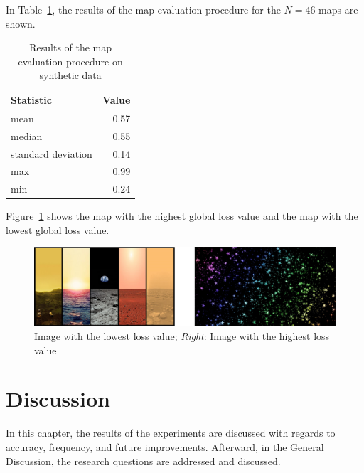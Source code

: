 \documentclass[11pt]{report}
\begin{document}


In Table~\ref{tab:mapeval}, the results of the map evaluation
procedure for the $N = 46$ maps are shown.

\begin{table}[h]
  \centering
  \begin{tabular}{lr}
    \toprule
    Statistic & Value\\
    \midrule
    mean & 0.57\\
    median & 0.55\\
    standard deviation & 0.14\\
    max & 0.99\\
    min & 0.24\\    
    \bottomrule
  \end{tabular}
  \caption[Map evaluation procedure on synthetic data]{Results of the map evaluation procedure on synthetic data}
  \label{tab:mapeval}

\end{table}

Figure~\ref{fig:minmaximg} shows the map with the highest global loss
value and the map with the lowest global loss value.

\begin{figure}[h!]
\begin{center}
\includegraphics[width=0.7\columnwidth]{lowest_highest}
\caption{{\label{fig:minmaximg}
Image with the lowest loss value; \emph{Right}:
    Image with the highest loss value%
}}
\end{center}
\end{figure}

\chapter{Discussion}
\label{chap:discussion}

In this chapter, the results of the experiments are discussed with
regards to accuracy, frequency, and future improvements. Afterward, in
the General Discussion, the research questions are addressed and
discussed.
\end{document}

